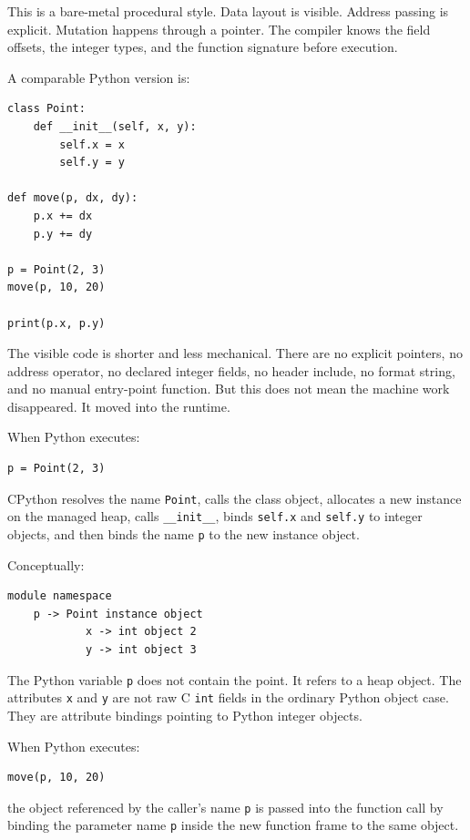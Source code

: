 This is a bare-metal procedural style. Data layout is visible. Address passing is explicit. Mutation happens through a pointer. The compiler knows the field offsets, the integer types, and the function signature before execution.

A comparable Python version is:

\begin{verbatim}
class Point:
    def __init__(self, x, y):
        self.x = x
        self.y = y

def move(p, dx, dy):
    p.x += dx
    p.y += dy

p = Point(2, 3)
move(p, 10, 20)

print(p.x, p.y)
\end{verbatim}

The visible code is shorter and less mechanical. There are no explicit pointers, no address operator, no declared integer fields, no header include, no format string, and no manual entry-point function. But this does not mean the machine work disappeared. It moved into the runtime.

When Python executes:

\begin{verbatim}
p = Point(2, 3)
\end{verbatim}

CPython resolves the name \texttt{Point}, calls the class object, allocates a new instance on the managed heap, calls \texttt{\_\_init\_\_}, binds \texttt{self.x} and \texttt{self.y} to integer objects, and then binds the name \texttt{p} to the new instance object.

Conceptually:

\begin{verbatim}
module namespace
    p -> Point instance object
            x -> int object 2
            y -> int object 3
\end{verbatim}

The Python variable \texttt{p} does not contain the point. It refers to a heap object. The attributes \texttt{x} and \texttt{y} are not raw C \texttt{int} fields in the ordinary Python object case. They are attribute bindings pointing to Python integer objects.

When Python executes:

\begin{verbatim}
move(p, 10, 20)
\end{verbatim}

the object referenced by the caller's name \texttt{p} is passed into the function call by binding the parameter name \texttt{p} inside the new function frame to the same object.

